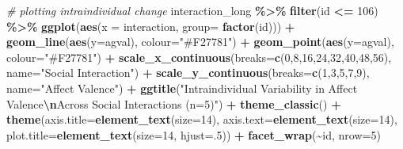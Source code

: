 \documentclass[
]{book}
\newenvironment{Shaded}{\begin{snugshade}}{\end{snugshade}}
\newcommand{\AttributeTok}[1]{\textcolor[rgb]{0.13,0.29,0.53}{#1}}
\newcommand{\CommentTok}[1]{\textcolor[rgb]{0.56,0.35,0.01}{\textit{#1}}}
\newcommand{\DecValTok}[1]{\textcolor[rgb]{0.00,0.00,0.81}{#1}}
\newcommand{\FunctionTok}[1]{\textcolor[rgb]{0.13,0.29,0.53}{\textbf{#1}}}
\newcommand{\NormalTok}[1]{#1}
\newcommand{\SpecialCharTok}[1]{\textcolor[rgb]{0.81,0.36,0.00}{\textbf{#1}}}
\newcommand{\StringTok}[1]{\textcolor[rgb]{0.31,0.60,0.02}{#1}}
\theoremstyle{definition}
\theoremstyle{definition}
\theoremstyle{definition}
\theoremstyle{definition}
\theoremstyle{remark}
\begin{document}
\begin{Shaded}
\begin{Highlighting}[]
\CommentTok{\# plotting intraindividual change }
\NormalTok{interaction\_long }\SpecialCharTok{\%\textgreater{}\%}
  \FunctionTok{filter}\NormalTok{(id }\SpecialCharTok{\textless{}=} \DecValTok{106}\NormalTok{) }\SpecialCharTok{\%\textgreater{}\%}
  \FunctionTok{ggplot}\NormalTok{(}\FunctionTok{aes}\NormalTok{(}\AttributeTok{x =}\NormalTok{ interaction, }\AttributeTok{group=} \FunctionTok{factor}\NormalTok{(id))) }\SpecialCharTok{+}
  \FunctionTok{geom\_line}\NormalTok{(}\FunctionTok{aes}\NormalTok{(}\AttributeTok{y=}\NormalTok{agval), }\AttributeTok{colour=}\StringTok{"\#F27781"}\NormalTok{) }\SpecialCharTok{+}
  \FunctionTok{geom\_point}\NormalTok{(}\FunctionTok{aes}\NormalTok{(}\AttributeTok{y=}\NormalTok{agval), }\AttributeTok{colour=}\StringTok{"\#F27781"}\NormalTok{) }\SpecialCharTok{+}
  \FunctionTok{scale\_x\_continuous}\NormalTok{(}\AttributeTok{breaks=}\FunctionTok{c}\NormalTok{(}\DecValTok{0}\NormalTok{,}\DecValTok{8}\NormalTok{,}\DecValTok{16}\NormalTok{,}\DecValTok{24}\NormalTok{,}\DecValTok{32}\NormalTok{,}\DecValTok{40}\NormalTok{,}\DecValTok{48}\NormalTok{,}\DecValTok{56}\NormalTok{), }\AttributeTok{name=}\StringTok{"Social Interaction"}\NormalTok{) }\SpecialCharTok{+}
  \FunctionTok{scale\_y\_continuous}\NormalTok{(}\AttributeTok{breaks=}\FunctionTok{c}\NormalTok{(}\DecValTok{1}\NormalTok{,}\DecValTok{3}\NormalTok{,}\DecValTok{5}\NormalTok{,}\DecValTok{7}\NormalTok{,}\DecValTok{9}\NormalTok{), }\AttributeTok{name=}\StringTok{"Affect Valence"}\NormalTok{) }\SpecialCharTok{+} 
  \FunctionTok{ggtitle}\NormalTok{(}\StringTok{"Intraindividual Variability in Affect Valence}\SpecialCharTok{\textbackslash{}n}\StringTok{Across Social Interactions (n=5)"}\NormalTok{) }\SpecialCharTok{+}
  \FunctionTok{theme\_classic}\NormalTok{() }\SpecialCharTok{+}
  \FunctionTok{theme}\NormalTok{(}\AttributeTok{axis.title=}\FunctionTok{element\_text}\NormalTok{(}\AttributeTok{size=}\DecValTok{14}\NormalTok{),}
        \AttributeTok{axis.text=}\FunctionTok{element\_text}\NormalTok{(}\AttributeTok{size=}\DecValTok{14}\NormalTok{),}
        \AttributeTok{plot.title=}\FunctionTok{element\_text}\NormalTok{(}\AttributeTok{size=}\DecValTok{14}\NormalTok{, }\AttributeTok{hjust=}\NormalTok{.}\DecValTok{5}\NormalTok{)) }\SpecialCharTok{+}
  \FunctionTok{facet\_wrap}\NormalTok{(}\SpecialCharTok{\textasciitilde{}}\NormalTok{id, }\AttributeTok{nrow=}\DecValTok{5}\NormalTok{)}
\end{Highlighting}
\end{Shaded}
\end{document}
